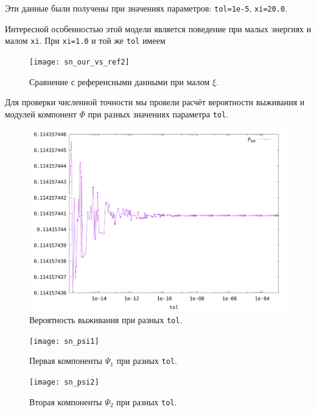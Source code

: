 \documentclass[12pt]{article}
\begin{document}
Эти данные были получены при значениях параметров: \verb|tol=1e-5|,
\verb|xi=20.0|.

Интересной особенностью этой модели является поведение при малых энергиях и
малом \verb|xi|. При \verb|xi=1.0| и той же \verb|tol| имеем
\begin{figure}[htb]
  \hspace*{-2em}
  \texttt{[image: sn\_our\_vs\_ref2]}
  \caption{\label{fig:3}Сравнение с референсными данными при малом \(\xi\).}
\end{figure}

Для проверки численной точности мы провели расчёт вероятности выживания и
модулей компонент \(\Phi\) при разных значениях параметра \verb|tol|.

\begin{figure}[htb]
  \hspace*{-2em}
  \includegraphics[scale=0.5]{sn_Pee}
  \caption{\label{fig:4}Вероятность выживания при разных \texttt{tol}.}
\end{figure}

\begin{figure}[htb]
  \hspace*{-2em}
  \texttt{[image: sn\_psi1]}
  \caption{\label{fig:5}Первая компоненты \(\Psi_{1}\) при разных \texttt{tol}.}
\end{figure}

\begin{figure}[htb]
  \hspace*{-2em}
  \texttt{[image: sn\_psi2]}
  \caption{\label{fig:6}Вторая компоненты \(\Psi_{2}\) при разных \texttt{tol}.}
\end{figure}
\end{document}
